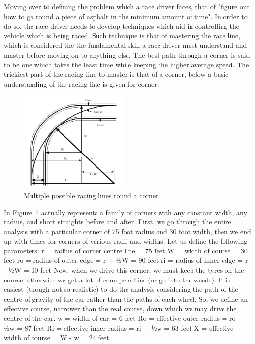 \documentclass{article}
\begin{document}
Moving over to defining the problem which a race driver faces, that of "figure out how to go round a piece of asphalt in the minimum amount of time"\cite{GoingFaster}. In order to do so, the race driver needs to develop techniques which aid in controlling the vehicle which is being raced. Such technique is that of mastering the race line, which is considered the the fundamental skill a race driver must understand and master before moving on to anything else\cite{GoingFaster}. The best path through a corner is said to be one which takes the least time while keeping the higher average speed\cite{beckman1991physics}. The trickiest part of the racing line to master is that of a corner, below a basic understanding of the racing line is given for corner.

\begin{figure}
	\centering
	\includegraphics[height=5cm]{Racing_Corner.png}
	\caption{Multiple possible racing lines round a corner}
	\label{fig:Racing_Corner}
\end{figure}

In Figure~\ref{fig:Racing_Corner} actually represents a family of corners with any constant width, any radius, and short straights before and after. First, we go through the entire analysis with a particular corner of 75 foot radius and 30 foot width, then we end up with times for corners of various radii and widths. 
Let us define the following parameters:
	r = radius of corner centre line = 75 feet
	W = width of course = 30 feet
	ro = radius of outer edge = r + ½W = 90 feet
	ri = radius of inner edge = r - ½W = 60 feet
Now, when we drive this corner, we must keep the tyres on the course, otherwise we get a lot of cone penalties (or go into the weeds). It is easiest (though not so realistic) to do the analysis considering the path of the centre of gravity of the car rather than the paths of each wheel. So, we define an effective course, narrower than the real course, down
which we may drive the centre of the car.
	w = width of car = 6 feet
	Ro = effective outer radius = ro - ½w = 87 feet
	Ri = effective inner radius = ri + ½w = 63 feet
	X = effective width of course = W - w = 24 feet
\end{document}
